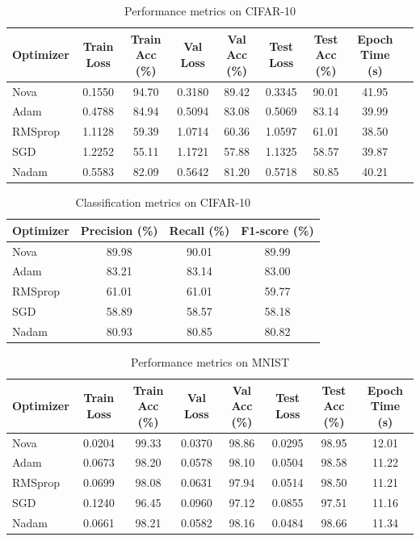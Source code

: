\documentclass{article}
\begin{document}
\begin{table}[H]
\centering
\caption{Performance metrics on CIFAR-10}
\begin{tabular}{lcccccccc}
\toprule
Optimizer & Train Loss & Train Acc (\%) & Val Loss & Val Acc (\%) & Test Loss & Test Acc (\%) & Epoch Time (s) \\
\midrule
Nova & 0.1550 & 94.70 & 0.3180 & 89.42 & 0.3345 & 90.01 & 41.95 \\
Adam & 0.4788 & 84.94 & 0.5094 & 83.08 & 0.5069 & 83.14& 39.99\\
RMSprop & 1.1128 & 59.39 & 1.0714 & 60.36 & 1.0597 & 61.01& 38.50 \\
SGD & 1.2252 & 55.11 & 1.1721 & 57.88 & 1.1325 & 58.57&39.87  \\
Nadam & 0.5583 & 82.09 & 0.5642 & 81.20 & 0.5718 & 80.85&40.21  \\
\bottomrule
\end{tabular}
\label{tab:cifar-10_main}
\end{table}


\begin{table}[H]
\centering
\caption{Classification metrics on CIFAR-10}
\begin{tabular}{lccc}
\toprule
Optimizer & Precision (\%) & Recall (\%) & F1-score (\%) \\
\midrule
Nova & 89.98 & 90.01 & 89.99 \\
Adam & 83.21 & 83.14 & 83.00 \\
RMSprop & 61.01 & 61.01 & 59.77 \\
SGD & 58.89 & 58.57 & 58.18 \\
Nadam & 80.93 & 80.85 & 80.82 \\
\bottomrule
\end{tabular}
\label{tab:cifar-10_prf}
\end{table}


\begin{table}[H]
\centering
\caption{Performance metrics on MNIST}
\begin{tabular}{lccccccc}
\toprule
Optimizer & Train Loss & Train Acc (\%) & Val Loss & Val Acc (\%) & Test Loss & Test Acc (\%) & Epoch Time (s) \\
\midrule
Nova & 0.0204 & 99.33 & 0.0370 & 98.86 & 0.0295 & 98.95&12.01 \\
Adam & 0.0673 & 98.20 & 0.0578 & 98.10 & 0.0504 & 98.58& 11.22\\
RMSprop & 0.0699 & 98.08 & 0.0631 & 97.94 & 0.0514 & 98.50& 11.21 \\
SGD & 0.1240 & 96.45 & 0.0960 & 97.12 & 0.0855 & 97.51& 11.16 \\
Nadam & 0.0661 & 98.21 & 0.0582 & 98.16 & 0.0484 & 98.66&  11.34\\
\bottomrule
\end{tabular}
\label{tab:mnist_main}
\end{table}
\end{document}
